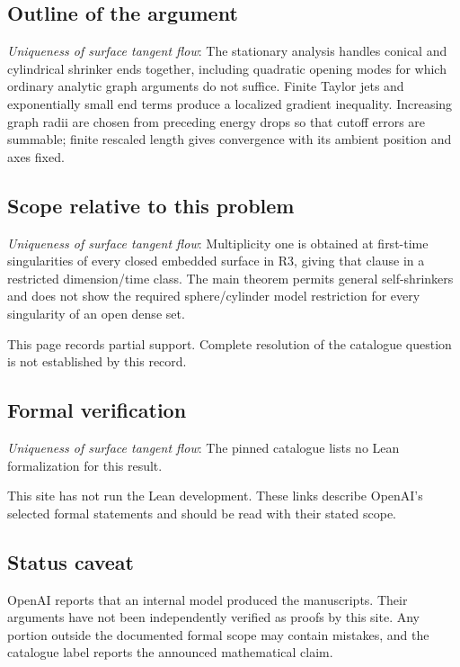 \documentclass[11pt]{article}
\begin{document}
\subsection{Outline of the argument}
\textit{Uniqueness of surface tangent flow}: The stationary analysis handles conical and cylindrical shrinker ends together, including quadratic opening modes for which ordinary analytic graph arguments do not suffice. Finite Taylor jets and exponentially small end terms produce a localized gradient inequality. Increasing graph radii are chosen from preceding energy drops so that cutoff errors are summable; finite rescaled length gives convergence with its ambient position and axes fixed.

\subsection{Scope relative to this problem}
\textit{Uniqueness of surface tangent flow}: Multiplicity one is obtained at first-time singularities of every closed embedded surface in R3, giving that clause in a restricted dimension/time class. The main theorem permits general self-shrinkers and does not show the required sphere/cylinder model restriction for every singularity of an open dense set.

This page records partial support. Complete resolution of the catalogue question is not established by this record.

\subsection{Formal verification}
\textit{Uniqueness of surface tangent flow}: The pinned catalogue lists no Lean formalization for this result.

This site has not run the Lean development. These links describe OpenAI’s selected formal statements and should be read with their stated scope.

\subsection{Status caveat}
OpenAI reports that an internal model produced the manuscripts. Their arguments have not been independently verified as proofs by this site. Any portion outside the documented formal scope may contain mistakes, and the catalogue label reports the announced mathematical claim.
\end{document}
